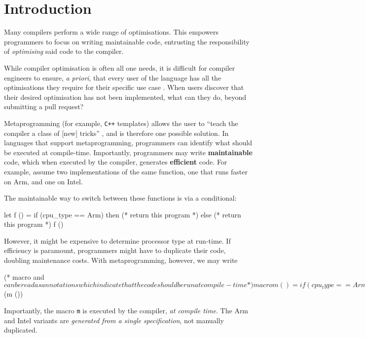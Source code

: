 \chapter{Introduction}

Many compilers perform a wide range of optimisations. This empowers programmers to focus on writing maintainable code, entrusting the responsibility of \textit{optimising} said code to the compiler. 

While compiler optimisation is often all one needs, it is difficult for compiler engineers to ensure, \textit{a priori}, that every user of the language has all the optimisations they require for their specific use case \citep{rice-53, robinson-01}. When users discover that their desired optimisation has not been implemented, what can they do, beyond submitting a pull request?

Metaprogramming (for example, \texttt{C++} templates) \citep{abrahams-04} allows the user to ``teach the compiler a class of [new] tricks'' \citep{sheard-02}, and is therefore one possible solution. In languages that support metaprogramming, programmers can identify what should be executed at compile-time. Importantly, programmers may write \textbf{maintainable} code, which when executed by the compiler, generates \textbf{efficient} code. For example, assume two implementations of the same function, one that runs faster on Arm, and one on Intel.

The maintainable way to switch between these functions is via a conditional:
\begin{ocaml}
let f () = if (cpu_type == Arm) then 
             (* return this program *)
           else 
             (* return this program *)
f ()
\end{ocaml}

However, it might be expensive to determine processor type at run-time. If efficiency is paramount, programmers might have to duplicate their code, doubling maintenance costs. With metaprogramming, however, we may write 
\begin{macocaml}
(* macro and $ can be read as annotations which 
   indicate that the code should be run at compile-time *)
macro m () = if (cpu_type == Arm) then 
               (* generate this program, to be run later *)
             else 
               (* gen this program, to be run later *)
$(m ())
\end{macocaml}
Importantly, the macro \texttt{m} is executed by the compiler, \textit{at compile time}. The Arm and Intel variants are \textit{generated from a single specification}, not manually duplicated.


